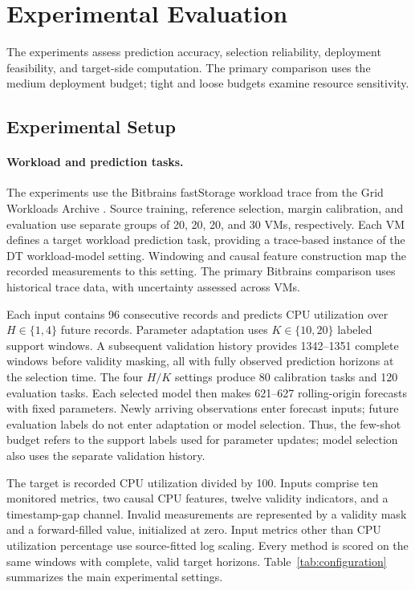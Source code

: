 \documentclass[a4paper,fleqn]{cas-sc}
\begin{document}
\section{Experimental Evaluation}
\label{sec:experiments}
The experiments assess prediction accuracy, selection reliability, deployment
feasibility, and target-side computation. The primary comparison uses the
medium deployment budget; tight and loose budgets examine resource sensitivity.

\subsection{Experimental Setup}
\label{subsec:experimental-setup}
\paragraph{Workload and prediction tasks.}
The experiments use the Bitbrains fastStorage workload trace from the Grid
Workloads Archive \cite{refBitbrains,refGWA}. Source training, reference
selection, margin calibration, and evaluation use separate groups of 20, 20,
20, and 30 VMs, respectively. Each VM defines a target workload prediction
task, providing a trace-based instance of the DT workload-model setting.
Windowing and causal feature construction map the recorded measurements to
this setting. The primary Bitbrains comparison uses historical trace data,
with uncertainty assessed across VMs.

Each input contains 96 consecutive records and predicts CPU utilization over
$H\in\{1,4\}$ future records. Parameter adaptation uses $K\in\{10,20\}$
labeled support windows. A subsequent validation history provides
1342--1351 complete windows before validity masking, all with fully observed
prediction horizons at the selection time. The four $H/K$ settings produce
80 calibration tasks and 120 evaluation tasks. Each selected model then makes
621--627 rolling-origin forecasts with fixed parameters. Newly arriving
observations enter forecast inputs; future evaluation labels do not enter
adaptation or model selection. Thus, the few-shot budget refers to the
support labels used for parameter updates; model selection also uses the
separate validation history.

The target is recorded CPU utilization divided by 100. Inputs comprise ten
monitored metrics, two causal CPU features, twelve validity indicators, and
a timestamp-gap channel. Invalid measurements are represented by a validity
mask and a forward-filled value, initialized at zero. Input metrics other than
CPU utilization percentage use source-fitted log scaling. Every method is
scored on the same windows with complete, valid target horizons.
Table~\ref{tab:configuration} summarizes the main experimental settings.
\end{document}

